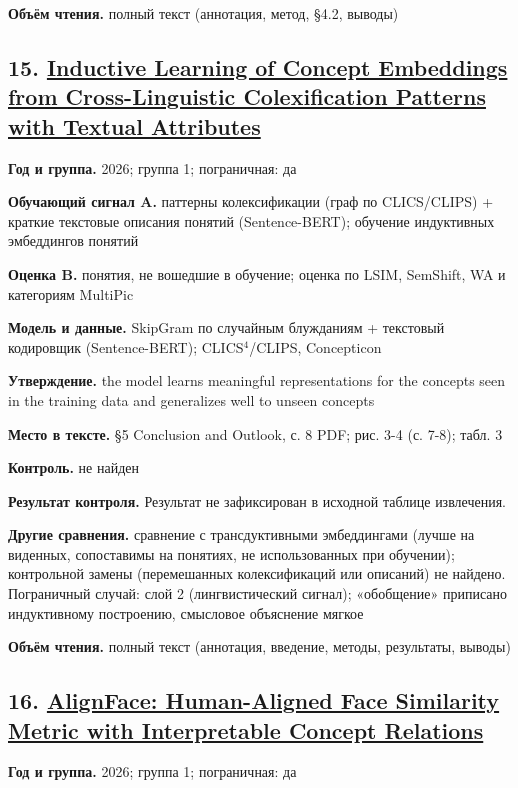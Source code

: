 \textbf{Объём чтения.} полный текст (аннотация, метод, §4.2, выводы)


\subsection*{15. \href{https://doi.org/10.48550/arxiv.2610.22638}{Inductive Learning of Concept Embeddings from Cross-Linguistic Colexification Patterns with Textual Attributes}}

\textbf{Год и группа.} 2026; группа 1; пограничная: да

\textbf{Обучающий сигнал A.} паттерны колексификации (граф по CLICS/CLIPS) + краткие текстовые описания понятий (Sentence-BERT); обучение индуктивных эмбеддингов понятий

\textbf{Оценка B.} понятия, не вошедшие в обучение; оценка по LSIM, SemShift, WA и категориям MultiPic

\textbf{Модель и данные.} SkipGram по случайным блужданиям + текстовый кодировщик (Sentence-BERT); CLICS$^4$/CLIPS, Concepticon

\textbf{Утверждение.} the model learns meaningful representations for the concepts seen in the training data and generalizes well to unseen concepts

\textbf{Место в тексте.} §5 Conclusion and Outlook, с. 8 PDF; рис. 3-4 (с. 7-8); табл. 3

\textbf{Контроль.} не найден

\textbf{Результат контроля.} Результат не зафиксирован в исходной таблице извлечения.

\textbf{Другие сравнения.} сравнение с трансдуктивными эмбеддингами (лучше на виденных, сопоставимы на понятиях, не использованных при обучении); контрольной замены (перемешанных колексификаций или описаний) не найдено. Пограничный случай: слой 2 (лингвистический сигнал); «обобщение» приписано индуктивному построению, смысловое объяснение мягкое

\textbf{Объём чтения.} полный текст (аннотация, введение, методы, результаты, выводы)


\subsection*{16. \href{https://doi.org/10.1145/3767308.3836354}{AlignFace: Human-Aligned Face Similarity Metric with Interpretable Concept Relations}}

\textbf{Год и группа.} 2026; группа 1; пограничная: да

